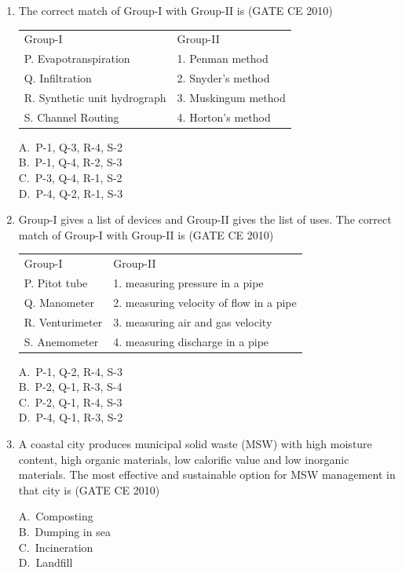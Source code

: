 \documentclass[journal,12pt,onecolumn]{exam}
\theoremstyle{remark}
\begin{document}
\begin{enumerate}
\noindent\item The correct match of Group-I with Group-II is
\hfill{(GATE CE 2010)}
\begin{table}[H]
\centering
\begin{tabular}{l l}
Group-I & Group-II \\
P. Evapotranspiration     & 1. Penman method \\
Q. Infiltration    & 2. Snyder’s method \\
R. Synthetic unit hydrograph    & 3. Muskingum method  \\
S. Channel Routing    & 4. Horton's method
\end{tabular}
\label{table1}
\end{table}

\begin{multicols}{4}
A.\ P-1, Q-3, R-4, S-2 \\
B.\ P-1, Q-4, R-2, S-3 \\
C.\ P-3, Q-4, R-1, S-2 \\
D.\ P-4, Q-2, R-1, S-3
\end{multicols}

\noindent\item Group-I gives a list of devices and Group-II gives the list of uses. The correct match of Group-I with Group-II is
\hfill{(GATE CE 2010)}

\begin{table}[H]
    \centering
\begin{tabular}{l l}
Group-I  & Group-II  \\
P. Pitot tube & 1. measuring pressure in a pipe \\
Q. Manometer   & 2. measuring velocity of flow in a pipe     \\
R. Venturimeter     & 3. measuring air and gas velocity          \\
S. Anemometer    & 4. measuring discharge in a pipe
\end{tabular}
\label{table2}
\end{table}

\begin{multicols}{4}
A.\ P-1, Q-2, R-4, S-3 \\
B.\ P-2, Q-1, R-3, S-4 \\
C.\ P-2, Q-1, R-4, S-3 \\
D.\ P-4, Q-1, R-3, S-2
\end{multicols}

\noindent\item A coastal city produces municipal solid waste (MSW) with high moisture content, high organic materials, low calorific value and low inorganic materials. The most effective and sustainable option for MSW management in that city is
\hfill{(GATE CE 2010)}
\begin{multicols}{4}
A.\ Composting \\
B.\ Dumping in sea \\
C.\ Incineration \\
D.\ Landfill
\end{multicols}


\end{enumerate}
\end{document}

